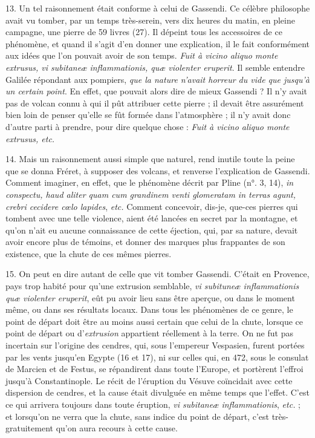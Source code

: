 \documentclass[a4paper, 11pt, oneside, polutonikogreek, french]{article}
\begin{document}
13. Un tel raisonnement était conforme à celui de Gassendi. Ce célèbre philosophe avait vu tomber, par un temps très-serein, vers dix heures du matin, en pleine campagne, une pierre de 59 livres (27). Il dépeint tous les accessoires de ce phénomène, et quand il s'agit d'en donner une explication, il le fait conformément aux idées que l'on pouvait avoir de son temps. \og \emph{Fuit à vicino aliquo monte extrusus, vi subitaneæ inflammationis, quæ violenter eruperit}. Il semble entendre Galilée répondant aux pompiers, \emph{que la nature n'avait horreur du vide que jusqu'à un certain point}. En effet, que pouvait alors dire de mieux Gassendi ? Il n'y avait pas de volcan connu à qui il pût attribuer cette pierre ; il devait être assurément bien loin de penser qu'elle se fût formée dans l'atmosphère ; il n'y avait donc d'autre parti à prendre, pour dire quelque chose : \og \emph{Fuit à vicino aliquo monte extrusus, etc.} \fg

14. Mais un raisonnement aussi simple que naturel, rend inutile toute la peine que se donna Fréret, à supposer des volcans, et renverse l'explication de Gassendi. Comment imaginer, en effet, que le phénomène décrit par Pline (n°. 3, 14), \emph{in conspectu, haud aliter quam cum grandinem venti glomeratam in terras agunt, crebri cecidere cœlo lapides}, \emph{etc.} Comment concevoir, dis-je, que-ces pierres qui tombent avec une telle violence, aient été lancées en secret par la montagne, et qu'on n'ait eu aucune connaissance de cette éjection, qui, par sa nature, devait avoir encore plus de témoins, et donner des marques plus frappantes de son existence, que la chute de ces mêmes pierres.

15. On peut en dire autant de celle que vit tomber Gassendi. C'était en Provence, pays trop habité pour qu’une extrusion semblable, \emph{vi subituneæ inflammationis quæ violenter eruperit}, eût pu avoir lieu sans être aperçue, ou dans le moment même, ou dans ses résultats locaux. Dans tous les phénomènes de ce genre, le point de départ doit être au moins aussi certain que celui de la chute, lorsque ce point de départ ou d'\emph{extrusion} appartient réellement à la terre. On ne fut pas incertain sur l'origine des cendres, qui, sous l'empereur Vespasien, furent portées par les vents jusqu'en Egypte (16 et 17), ni sur celles qui, en 472, sous le consulat de Marcien et de Festus, se répandirent dans toute l'Europe, et portèrent l'effroi jusqu'à Constantinople. Le récit de l'éruption du Vésuve coïncidait avec cette dispersion de cendres, et la cause était divulguée en même temps que l'effet. C'est ce qui arrivera toujours dans toute éruption, \emph{vi subitaneæ inflammationis}, \emph{etc.} ; et lorsqu'on ne verra que la chute, sans indice du point de départ, c'est très-gratuitement qu'on aura recours à cette cause.
\end{document}
